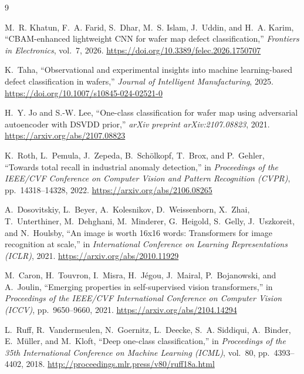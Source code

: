 \documentclass[11pt]{article}
\begin{document}
\newpage
\begin{thebibliography}{9}

M.~R. Khatun, F.~A. Farid, S.~Dhar, M.~S. Islam, J.~Uddin, and H.~A. Karim,
\newblock ``CBAM-enhanced lightweight CNN for wafer map defect classification,''
\newblock \textit{Frontiers in Electronics}, vol.~7, 2026.
\newblock \url{https://doi.org/10.3389/felec.2026.1750707}

K.~Taha,
\newblock ``Observational and experimental insights into machine learning-based defect classification in wafers,''
\newblock \textit{Journal of Intelligent Manufacturing}, 2025.
\newblock \url{https://doi.org/10.1007/s10845-024-02521-0}

H.~Y. Jo and S.-W. Lee,
\newblock ``One-class classification for wafer map using adversarial autoencoder with DSVDD prior,''
\newblock \textit{arXiv preprint arXiv:2107.08823}, 2021.
\newblock \url{https://arxiv.org/abs/2107.08823}

K.~Roth, L.~Pemula, J.~Zepeda, B.~Sch\"{o}lkopf, T.~Brox, and P.~Gehler,
\newblock ``Towards total recall in industrial anomaly detection,''
\newblock in \textit{Proceedings of the IEEE/CVF Conference on Computer Vision and Pattern Recognition (CVPR)},
\newblock pp.\ 14318--14328, 2022.
\newblock \url{https://arxiv.org/abs/2106.08265}

A.~Dosovitskiy, L.~Beyer, A.~Kolesnikov, D.~Weissenborn, X.~Zhai, T.~Unterthiner,
M.~Dehghani, M.~Minderer, G.~Heigold, S.~Gelly, J.~Uszkoreit, and N.~Houlsby,
\newblock ``An image is worth 16x16 words: Transformers for image recognition at scale,''
\newblock in \textit{International Conference on Learning Representations (ICLR)}, 2021.
\newblock \url{https://arxiv.org/abs/2010.11929}

M.~Caron, H.~Touvron, I.~Misra, H.~J\'{e}gou, J.~Mairal, P.~Bojanowski, and A.~Joulin,
\newblock ``Emerging properties in self-supervised vision transformers,''
\newblock in \textit{Proceedings of the IEEE/CVF International Conference on Computer Vision (ICCV)},
\newblock pp.\ 9650--9660, 2021.
\newblock \url{https://arxiv.org/abs/2104.14294}

L.~Ruff, R.~Vandermeulen, N.~Goernitz, L.~Deecke, S.~A. Siddiqui, A.~Binder, E.~M\"{u}ller, and M.~Kloft,
\newblock ``Deep one-class classification,''
\newblock in \textit{Proceedings of the 35th International Conference on Machine Learning (ICML)},
\newblock vol.\ 80, pp.\ 4393--4402, 2018.
\newblock \url{http://proceedings.mlr.press/v80/ruff18a.html}


\end{thebibliography}
\end{document}
